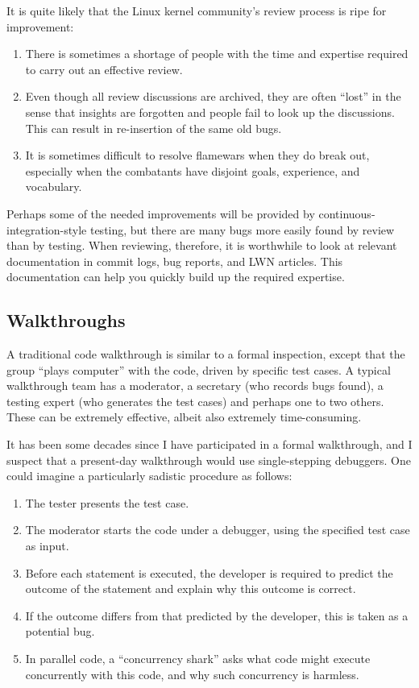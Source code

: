 It is quite likely that the Linux kernel community's review process
is ripe for improvement:

\begin{enumerate}
\item	There is sometimes a shortage of people with the time and
	expertise required to carry out an effective review.
\item	Even though all review discussions are archived, they are
	often ``lost'' in the sense that insights are forgotten and
	people fail to look up the discussions.
	This can result in re-insertion of the same old bugs.
\item	It is sometimes difficult to resolve flamewars when they do
	break out, especially when the combatants have disjoint
	goals, experience, and vocabulary.
\end{enumerate}

Perhaps some of the needed improvements will be provided by
continuous-integration-style testing, but there are many bugs more
easily found by review than by testing.
When reviewing, therefore, it is worthwhile to look at relevant documentation
in commit logs, bug reports, and LWN articles.
This documentation can help you quickly build up the required expertise.

\subsection{Walkthroughs}
\label{sec:debugging:Walkthroughs}

A traditional code walkthrough is similar to a formal inspection,
except that the group
``plays computer'' with the code, driven by specific test cases.
A typical walkthrough team has a moderator, a secretary (who records
bugs found), a testing expert (who generates the test cases) and
perhaps one to two others.
These can be extremely effective, albeit also extremely time-consuming.

It has been some decades since I have participated in a formal
walkthrough, and I suspect that a present-day walkthrough would
use single-stepping debuggers.
One could imagine a particularly sadistic procedure as follows:

\begin{enumerate}
\item	The tester presents the test case.
\item	The moderator starts the code under a debugger, using the
	specified test case as input.
\item	Before each statement is executed, the developer is required
	to predict the outcome of the statement and explain why
	this outcome is correct.
\item	If the outcome differs from that predicted by the developer,
	this is taken as a potential bug.
\item	In parallel code, a ``concurrency shark'' asks what code
	might execute concurrently with this code, and why such
	concurrency is harmless.
\end{enumerate}

